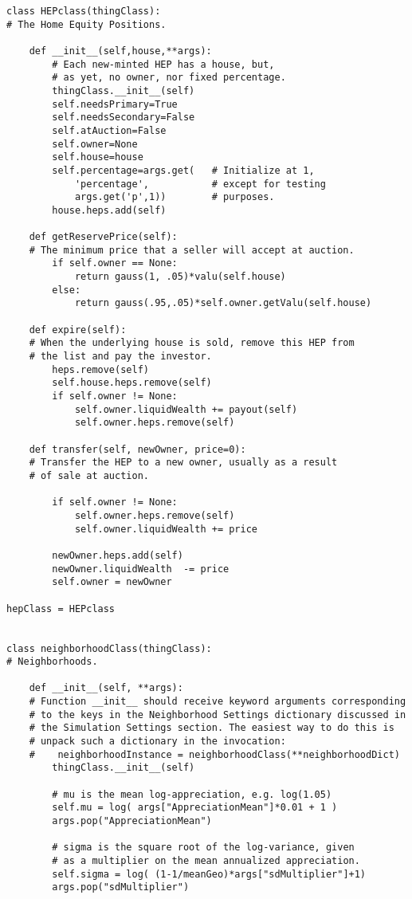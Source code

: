 \begin{lstlisting}
class HEPclass(thingClass):
# The Home Equity Positions.

    def __init__(self,house,**args):
        # Each new-minted HEP has a house, but,
        # as yet, no owner, nor fixed percentage.
        thingClass.__init__(self) 
        self.needsPrimary=True
        self.needsSecondary=False
        self.atAuction=False
        self.owner=None
        self.house=house
        self.percentage=args.get(   # Initialize at 1,
            'percentage',           # except for testing
            args.get('p',1))        # purposes.
        house.heps.add(self)

    def getReservePrice(self):
    # The minimum price that a seller will accept at auction.
        if self.owner == None:
            return gauss(1, .05)*valu(self.house)
        else:
            return gauss(.95,.05)*self.owner.getValu(self.house)

    def expire(self):
    # When the underlying house is sold, remove this HEP from
    # the list and pay the investor.
        heps.remove(self)
        self.house.heps.remove(self)
        if self.owner != None:
            self.owner.liquidWealth += payout(self)
            self.owner.heps.remove(self)

    def transfer(self, newOwner, price=0):
    # Transfer the HEP to a new owner, usually as a result
    # of sale at auction.
        
        if self.owner != None:
            self.owner.heps.remove(self)
            self.owner.liquidWealth += price

        newOwner.heps.add(self)
        newOwner.liquidWealth  -= price
        self.owner = newOwner
        
hepClass = HEPclass


class neighborhoodClass(thingClass):
# Neighborhoods.

    def __init__(self, **args):
    # Function __init__ should receive keyword arguments corresponding
    # to the keys in the Neighborhood Settings dictionary discussed in
    # the Simulation Settings section. The easiest way to do this is
    # unpack such a dictionary in the invocation:
    #    neighborhoodInstance = neighborhoodClass(**neighborhoodDict)
        thingClass.__init__(self)

        # mu is the mean log-appreciation, e.g. log(1.05)
        self.mu = log( args["AppreciationMean"]*0.01 + 1 )
        args.pop("AppreciationMean")
        
        # sigma is the square root of the log-variance, given
        # as a multiplier on the mean annualized appreciation.
        self.sigma = log( (1-1/meanGeo)*args["sdMultiplier"]+1)
        args.pop("sdMultiplier")


\end{lstlisting}
